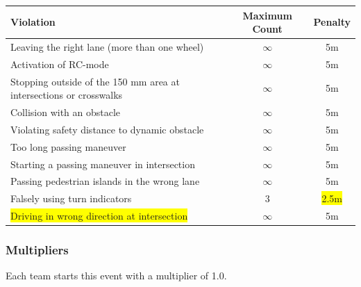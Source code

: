 \documentclass[a4paper]{report}
\begin{document}
\begin{mdframed}[linecolor=red,linewidth=2pt]
	\begin{table}[H]
		\begin{tabular}{@{}lcc@{}}
			\toprule
			\textbf{Violation}                                                 & \textbf{Maximum Count} & \textbf{Penalty}        \\ \midrule
			Leaving the right lane (more than one wheel)                       & $\infty$               & 5m                      \\
			Activation of RC-mode                                              & $\infty$               & 5m                      \\
			Stopping outside of the 150 mm area at intersections or crosswalks & $\infty$               & 5m                      \\
			Collision with an obstacle                                         & $\infty$               & 5m                      \\
			Violating safety distance to dynamic obstacle                      & $\infty$               & 5m                      \\
			Too long passing maneuver                                          & $\infty$               & 5m                      \\
			Starting a passing maneuver in intersection                        & $\infty$               & 5m                      \\
			Passing pedestrian islands in the wrong lane                       & $\infty$               & 5m                      \\
			Falsely using turn indicators                                      & 3                      & \colorbox{yellow}{2.5m} \\
			\colorbox{yellow}{Driving in wrong direction at intersection}      & $\infty$               & 5m                      \\ \bottomrule
		\end{tabular}
	\end{table}

	\subsubsection{Multipliers}
	\label{obstacle_multipliers}

	Each team starts this event with a multiplier of 1.0.


\end{mdframed}
\end{document}
